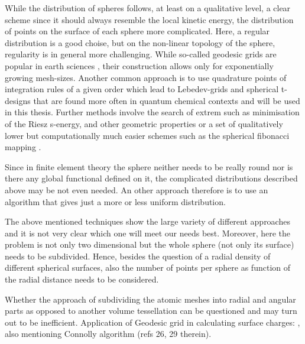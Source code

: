 While the distribution of spheres follows, at least on a qualitative level, a clear scheme since it should always resemble the local kinetic energy, the distribution of points on the surface of each sphere more complicated.
Here, a regular distribution is a good choise, but on the non-linear topology of the sphere, regularity is in general more challenging.
While so-called geodesic grids are popular in earth sciences \cite{geodesic1,geodesic2,geodes_charge}, their construction allows only for exponentially growing mesh-sizes.
Another common approach is to use quadrature points of integration rules of a given order which lead to Lebedev-grids \cite{lebedev,lebedev2} and spherical t-designs \cite{t-design1, t-design2} that are found more often in quantum chemical contexts \cite{LebQC1,LebQC2,lebDFT,lebDFT2} and will be used in this thesis.
Further methods involve the search of extrem such as minimisation of the Riesz s-energy, and other geometric properties \cite{fliegeMaier,womersley,wom2,wom3} or a set of qualitatively lower but computationally much easier schemes such as the spherical fibonacci mapping \cite{fibonacci,fibonacci2}.

Since in finite element theory the sphere neither needs to be really round nor is there any global functional defined on it,
the complicated distributions described above may be not even needed. 
An other approach therefore is to use an algorithm that gives just a more or less uniform distribution.


The above mentioned techniques show the large variety of different approaches and it is not very clear which one will meet our needs best.
Moreover, here the problem is not only two dimensional but the whole sphere (not only its surface) needs to be subdivided. 
Hence, besides the question of a radial density of different spherical surfaces, also the number of points per sphere as function of the radial distance 
needs to be considered.

Whether the approach of subdividing the atomic meshes into radial and angular parts as opposed to another volume tessellation can be questioned and 
may turn out to be inefficient.
Application of Geodesic grid in calculating surface charges: \cite{geodes_charge}, also mentioning Connolly algorithm (refs 26, 29 therein).

